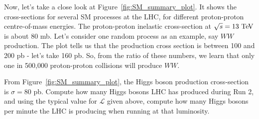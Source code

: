 Now, let's take a close look at Figure~\ref{fig:SM_summary_plot}. It shows the cross-sections for several SM processes at the LHC, for different proton-proton centre-of-mass energies. The proton-proton inelastic cross-section at $\sqrt{s} = 13\ \text{Te\kern -0.1em V}$ is about $80$ mb. Let's consider one random process as an example, say $WW$ production. The plot tells us that the production cross section is between 100 and 200 pb - let's take 160 pb. So, from the ratio of these numbers, we learn that only one in 500,000 proton-proton collisions will produce $WW$. 

\begin{exercise}
From Figure~\ref{fig:SM_summary_plot}, the Higgs boson production cross-section is $\sigma = 80$ pb. Compute how many Higgs bosons LHC has produced during Run 2, and using the typical value for $\mathcal{L}$ given above, compute how many Higgs bosons per minute the LHC is producing when running at that luminosity. 
\end{exercise}
